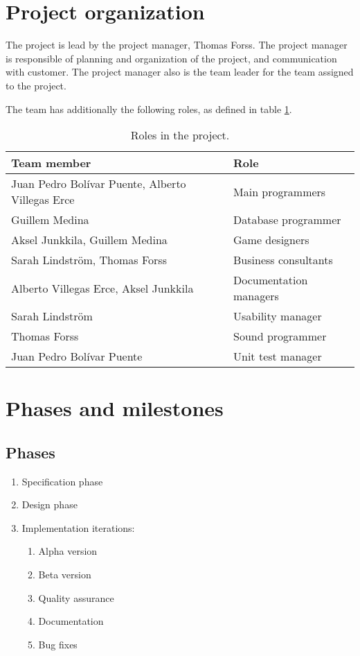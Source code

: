 \documentclass[12pt,a4paper]{article}
\begin{document}
\section{Project organization}

The project is lead by the project manager, Thomas Forss. The project
manager is responsible of planning and organization of the project,
and communication with customer. The project manager also is the team
leader for the team assigned to the project.

The team has additionally the following roles, as defined in table
\ref{tab:roles}.

\begin{table}[h!]
\small
\begin{tabular}{l|l}
Team member                                      &Role \\\hline\hline
Juan Pedro Bolívar Puente, Alberto Villegas Erce &Main programmers\\
Guillem Medina 					 &Database programmer\\
Aksel Junkkila, Guillem Medina			 &Game designers\\		
Sarah Lindström, Thomas Forss			 &Business consultants\\
Alberto Villegas Erce, Aksel Junkkila		 &Documentation managers\\
Sarah Lindström					 &Usability manager\\
Thomas Forss					 &Sound programmer\\
Juan Pedro Bolívar Puente			 &Unit test manager\\
\end{tabular}
\caption{Roles in the project.}
\label{tab:roles}
\end{table}

\section{Phases and milestones}

\subsection{Phases}
\begin{enumerate}
\item Specification phase
\item Design phase	
\item Implementation iterations:
\begin{enumerate}
\item Alpha version
\item Beta version
\item Quality assurance
\item Documentation
\item Bug fixes
\end{enumerate}
\end{enumerate}
\end{document}
